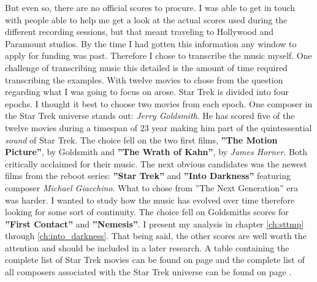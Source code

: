 But even so, there are no official scores to procure. I was able to get in touch with people able to help me get a look at the actual scores used during the different recording sessions, but that meant traveling to Hollywood and Paramount studios. By the time I had gotten this information any window to apply for funding was past. Therefore I chose to transcribe the music myself. One challenge of transcribing music this detailed is the amount of time required transcribing the examples. With twelve movies to chose from the question regarding what I was going to focus on arose. Star Trek is divided into four epochs. I thought it best to choose two movies from each epoch. One composer in the Star Trek universe stands out: \textit{Jerry Goldsmith}. He has scored five of the twelve movies during a timespan of 23 year making him part of the quintessential \textit{sound} of Star Trek. The choice fell on the two first films, \textbf{''The Motion Picture''}, by Goldsmith and \textbf{''The Wrath of Kahn''}, by \textit{James Horner}. Both critically acclaimed for their music. The next obvious candidates was the newest films from the reboot series: \textbf{''Star Trek''} and \textbf{''Into Darkness''} featuring composer \textit{Michael Giacchino}. What to chose from ''The Next Generation'' era was harder. I wanted to study how the music has evolved over time therefore looking for some sort of continuity. The choice fell on Goldsmiths scores for \textbf{''First Contact''} and \textbf{''Nemesis''}. I present my analysis in chapter \ref{ch:sttmp} through \ref{ch:into_darkness}. That being said, the other scores are well worth the attention and should be included in a later research. A table containing the complete list of Star Trek movies can be found on page \pageref{tb:filmography} and the complete list of all composers associated with the Star Trek universe can be found on page \pageref{tb:star trek composers}.


